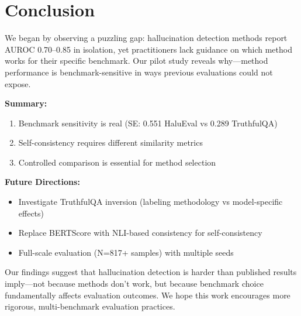 \section{Conclusion}
\label{sec:conclusion}

We began by observing a puzzling gap: hallucination detection methods report AUROC 0.70--0.85 in isolation, yet practitioners lack guidance on which method works for their specific benchmark. Our pilot study reveals why---method performance is benchmark-sensitive in ways previous evaluations could not expose.

\textbf{Summary:}
\begin{enumerate}
    \item Benchmark sensitivity is real (SE: 0.551 HaluEval vs 0.289 TruthfulQA)
    \item Self-consistency requires different similarity metrics
    \item Controlled comparison is essential for method selection
\end{enumerate}

\textbf{Future Directions:}
\begin{itemize}
    \item Investigate TruthfulQA inversion (labeling methodology vs model-specific effects)
    \item Replace BERTScore with NLI-based consistency for self-consistency
    \item Full-scale evaluation (N=817+ samples) with multiple seeds
\end{itemize}

Our findings suggest that hallucination detection is harder than published results imply---not because methods don't work, but because benchmark choice fundamentally affects evaluation outcomes. We hope this work encourages more rigorous, multi-benchmark evaluation practices.
